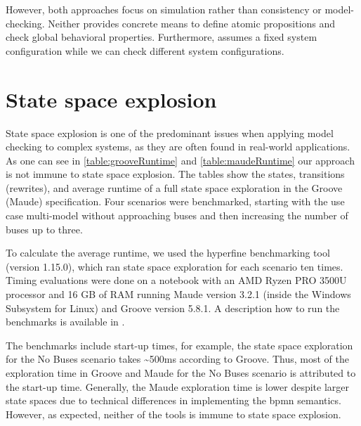 \documentclass{jot}
\begin{document}
However, both approaches focus on simulation rather than consistency or model-checking.
Neither provides concrete means to define atomic propositions and check global behavioral properties.
Furthermore, \cite{varalarsenBehavioralCoordinationOperator2015} assumes a fixed system configuration while we can check different system configurations.

\section{State space explosion} \label{sec:state_space_explosion}
State space explosion is one of the predominant issues when applying model checking to complex systems, as they are often found in real-world applications.
As one can see in \cref{table:grooveRuntime} and \cref{table:maudeRuntime} our approach is not immune to state space explosion.
The tables show the states, transitions (rewrites), and average runtime of a full state space exploration in the Groove (Maude) specification.
Four scenarios were benchmarked, starting with the use case multi-model without approaching buses and then increasing the number of buses up to three.

To calculate the average runtime, we used the hyperfine benchmarking tool \cite{peterHyperfine2022} (version 1.15.0), which ran state space exploration for each scenario ten times.
Timing evaluations were done on a notebook with an AMD Ryzen PRO 3500U processor and 16 GB of RAM running Maude version 3.2.1 (inside the Windows Subsystem for Linux) and Groove version 5.8.1.
A description how to run the benchmarks is available in \cite{krauterArtifactsBehavioralConsistency2022}.

The benchmarks include start-up times, for example, the state space exploration for the \textsf{No Buses} scenario takes \textasciitilde 500ms according to Groove.
Thus, most of the exploration time in Groove and Maude for the \textsf{No Buses} scenario is attributed to the start-up time.
Generally, the Maude exploration time is lower despite larger state spaces due to technical differences in implementing the \gls*{bpmn} semantics.
However, as expected, neither of the tools is immune to state space explosion.
\end{document}
